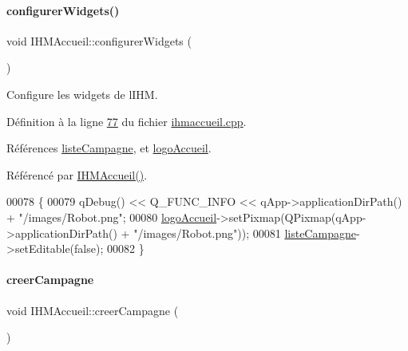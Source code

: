 \paragraph{\texorpdfstring{configurer\+Widgets()}{configurerWidgets()}}
{\footnotesize\ttfamily void I\+H\+M\+Accueil\+::configurer\+Widgets (\begin{DoxyParamCaption}{ }\end{DoxyParamCaption})\hspace{0.3cm}{\ttfamily [private]}}



Configure les widgets de l\textquotesingle{}I\+HM. 



Définition à la ligne \hyperlink{ihmaccueil_8cpp_source_l00077}{77} du fichier \hyperlink{ihmaccueil_8cpp_source}{ihmaccueil.\+cpp}.



Références \hyperlink{ihmaccueil_8h_source_l00037}{liste\+Campagne}, et \hyperlink{ihmaccueil_8h_source_l00038}{logo\+Accueil}.



Référencé par \hyperlink{ihmaccueil_8cpp_source_l00014}{I\+H\+M\+Accueil()}.


\begin{DoxyCode}
00078 \{
00079     qDebug() << Q\_FUNC\_INFO << qApp->applicationDirPath() + \textcolor{stringliteral}{"/images/Robot.png"};
00080     \hyperlink{class_i_h_m_accueil_a709440124f3307589eee68c517833e6d}{logoAccueil}->setPixmap(QPixmap(qApp->applicationDirPath() + \textcolor{stringliteral}{"/images/Robot.png"}));
00081     \hyperlink{class_i_h_m_accueil_afb828a4e06c25afa40341c310cd85b08}{listeCampagne}->setEditable(\textcolor{keyword}{false});
00082 \}
\end{DoxyCode}
\mbox{\label{class_i_h_m_accueil_a1da45b17d6e4198f87a9a0e05d1f7fd5}} 
\paragraph{\texorpdfstring{creer\+Campagne}{creerCampagne}}
{\footnotesize\ttfamily void I\+H\+M\+Accueil\+::creer\+Campagne (\begin{DoxyParamCaption}{ }\end{DoxyParamCaption})\hspace{0.3cm}{\ttfamily [slot]}}



